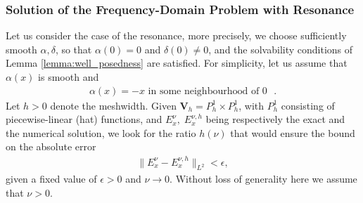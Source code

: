 \subsubsection{Solution of the Frequency-Domain Problem with Resonance}
Let us consider the case of the resonance, more precisely, we choose sufficiently smooth
$\alpha,\delta$, so that $\alpha(0)=0$ and $\delta(0)\neq 0$, and the solvability conditions 
of Lemma \ref{lemma:well_posedness}  are satisfied. 
For simplicity, let us assume that $\alpha(x)$ is smooth and 
\begin{align}
\label{eq:cond}
\alpha(x)=-x \text{  in some neighbourhood of $0$ }.
\end{align}
Let $h>0$ denote the meshwidth. Given $\mathbf{V}_{h}=P_{h}^{1}\times P_{h}^{1}$, with $P_{h}^{1}$ consisting of piecewise-linear (hat) functions, 
and $E^{\nu}_{x},\;E^{\nu,h}_{x}$ being respectively the exact and the numerical solution, 
we look for the ratio $h(\nu)$ that would ensure the bound on the absolute error 
\begin{align}
\label{eq:problem1}
\|E^{\nu}_{x}-E^{\nu,h}_{x}\|_{L^2}<\epsilon,
\end{align}
given a fixed value of $\epsilon>0$ and $\nu\rightarrow 0$. Without loss of generality here we assume that $\nu>0$. 

